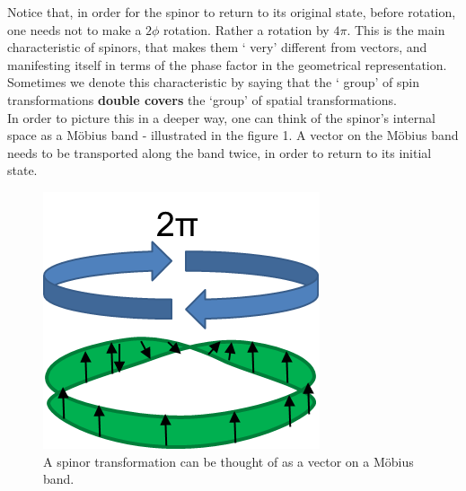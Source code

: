Notice that, in order for the spinor to return to its original state, before rotation, one needs not to make a $ 2 \phi$ rotation. Rather a rotation by $ 4\pi$. This is the main characteristic of spinors, that makes them ` very' different from vectors, and manifesting itself in terms of the phase factor in the geometrical representation. Sometimes we denote this characteristic by saying that the ` group' of spin transformations \textbf{double covers} the `group' of spatial transformations.  \\
In order to picture this in a deeper way, one can think of the spinor's internal space as a M\"{o}bius band - illustrated in the figure 1. A vector on the M\"{o}bius band needs to be transported along the band twice, in order to return to its initial state. 
\begin{figure}
	\centering
	\includegraphics[scale = .8]{./figures/mb}
	\caption{ A spinor transformation can be thought of as a vector on a  M\"{o}bius band.}
\end{figure}
